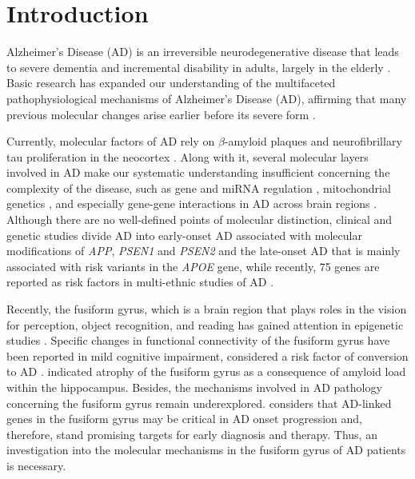 \documentclass[utf8]{FrontiersinHarvard} %
\begin{document}
\section{Introduction}

Alzheimer's Disease (AD) is an irreversible neurodegenerative disease that leads to severe dementia and incremental disability in adults, largely in the elderly \citep*{facts2022}. Basic research has expanded our understanding of the multifaceted pathophysiological mechanisms of Alzheimer's Disease (AD), affirming that many previous molecular changes arise earlier before its severe form \citep{aisen2017path}. 

Currently, molecular factors of AD rely on $\beta$-amyloid plaques and neurofibrillary tau proliferation in the neocortex \citep{jack2018nia}. Along with it, several molecular layers involved in AD make our systematic understanding insufficient concerning the complexity of the disease, such as gene and miRNA regulation \citep{souza2016combined, brito2020differential}, mitochondrial genetics \citep{cavalcante2022mitochondrial, song2022targeted}, and especially gene-gene interactions in AD across brain regions \citep{wang2021genome, lancour2020analysis}. Although there are no well-defined points of molecular distinction, clinical and genetic studies divide AD into early-onset AD associated with molecular modifications of \textit{APP}, \textit{PSEN1} and \textit{PSEN2} \citep{wan2020meta} and the late-onset AD that is mainly associated with risk variants in the \textit{APOE} gene, while recently, 75 genes are reported as risk factors in multi-ethnic studies of AD \citep{bellenguez2022new}.

Recently, the fusiform gyrus, which is a brain region that plays roles in  the vision for perception, object recognition, and reading has gained attention in epigenetic studies
\citep{srinivasan2020alzheimer}. Specific changes in functional connectivity of the fusiform gyrus have been reported in mild cognitive impairment, considered a  risk factor of conversion to AD \citep{ma2020fusiform}. \citet{chang2016hippocampal} indicated atrophy of the fusiform gyrus as a consequence of amyloid load within the hippocampus. Besides, the mechanisms involved in AD pathology concerning the fusiform gyrus remain underexplored. \citet{ma2020fusiform} considers that AD-linked genes in the fusiform gyrus may be critical in AD onset progression and, therefore, stand promising targets for early diagnosis and therapy. Thus, an investigation into the molecular mechanisms in the fusiform gyrus of AD patients is necessary.
\end{document}
